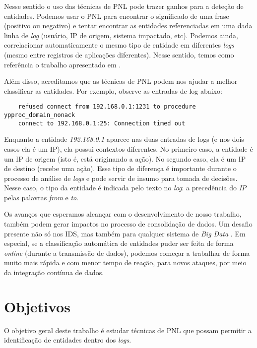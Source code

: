 \documentclass[
	12pt,				%
	openright,			%
	twoside,			%
	a4paper,			%
	english,			%
	spanish,			%
	brazil,				%
	]{abntex2}
\begin{document}
Nesse sentido o uso das técnicas de PNL pode trazer ganhos para a deteção de entidades. Podemos usar o PNL para encontrar o significado de uma frase (positivo ou negativo) e tentar encontrar as entidades referenciadas em uma dada linha de \emph{log} (usuário, IP de origem, sistema impactado, etc). Podemos ainda, correlacionar automaticamente o mesmo tipo de entidade em diferentes \emph{logs} (mesmo entre registros de aplicações diferentes).  Nesse sentido, temos como referência o trabalho apresentado em \cite{duque2012processo}.

Além disso, acreditamos que as técnicas de PNL podem nos ajudar a melhor classificar as entidades. Por exemplo, observe as entradas de log abaixo:

{\small
	\begin{verbatim}
	refused connect from 192.168.0.1:1231 to procedure ypproc_domain_nonack
	connect to 192.168.0.1:25: Connection timed out
	\end{verbatim}
}

Enquanto a entidade \emph{192.168.0.1} aparece nas duas entradas de logs (e nos dois casos ela é um IP), ela possui contextos diferentes. No primeiro caso, a entidade é um IP de origem (isto é, está originando a ação). No segundo caso, ela é um IP de destino (recebe uma ação). Esse tipo de diferença é importante durante o processo de análise de \emph{logs} e pode servir de insumo para tomada de decisões. Nesse caso, o tipo da entidade é indicada pelo texto no \emph{log}: a precedência do \emph{IP} pelas palavras \emph{from} e \emph{to}.

Os avanços que esperamos alcançar com o desenvolvimento de nosso trabalho, também podem gerar impactos no processo de consolidação de dados. Um desafio presente não só nos IDS, mas também para qualquer sistema de \emph{Big Data} \cite{zuech2015intrusion}. Em especial, se a classificação automática de entidades puder ser feita de forma \emph{online} (durante a transmissão de dados), podemos começar a trabalhar de forma muito mais rápida e com menor tempo de reação, para novos ataques, por meio da integração contínua de dados.


\section{Objetivos}
O objetivo geral deste trabalho é estudar técnicas de PNL que possam permitir a identificação de entidades dentro dos \emph{logs}.
\end{document}
